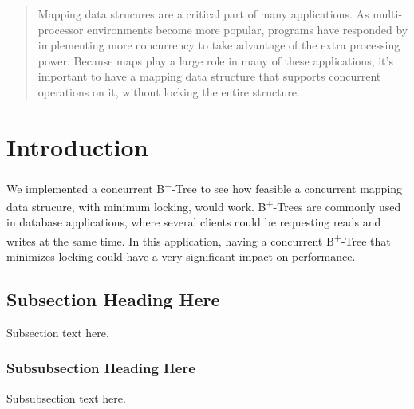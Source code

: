 \documentclass[conference]{IEEEtran}
\begin{document}
\begin{abstract}
Mapping data strucures are a critical part of many applications. As multi-processor
environments become more popular, programs have responded by implementing
more concurrency to take advantage of the extra processing power. Because maps
play a large role in many of these applications, it's important to have a 
mapping data structure that supports concurrent operations on it, without
locking the entire structure.
\end{abstract}





%
\IEEEpeerreviewmaketitle



\section{Introduction}
We implemented a concurrent B\textsuperscript{+}-Tree to see how feasible a
concurrent mapping data strucure, with minimum locking, would work.
B\textsuperscript{+}-Trees are commonly used in database applications, where
several clients could be requesting reads and writes at the same time. In this
application, having a concurrent B\textsuperscript{+}-Tree that minimizes
locking could have a very significant impact on performance.

\subsection{Subsection Heading Here}
Subsection text here.


\subsubsection{Subsubsection Heading Here}
Subsubsection text here.
\end{document}
